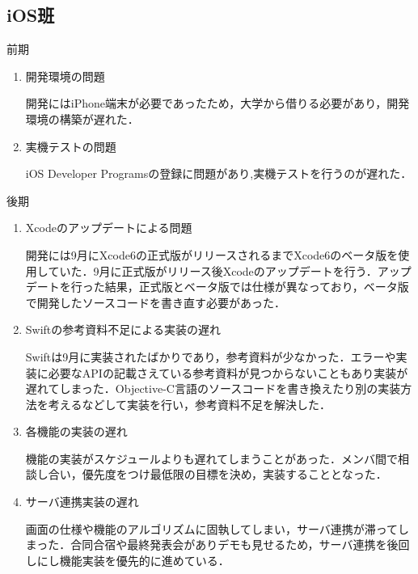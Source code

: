 \subsection{iOS班}
前期
\begin{enumerate}
\item 開発環境の問題
\par 開発にはiPhone端末が必要であったため，大学から借りる必要があり，開発環境の構築が遅れた．
\item 実機テストの問題
\par iOS Developer Programsの登録に問題があり,実機テストを行うのが遅れた．
\end{enumerate}

後期
\begin{enumerate}
\item Xcodeのアップデートによる問題
\par 開発には9月にXcode6の正式版がリリースされるまでXcode6のベータ版を使用していた．9月に正式版がリリース後Xcodeのアップデートを行う．アップデートを行った結果，正式版とベータ版では仕様が異なっており，ベータ版で開発したソースコードを書き直す必要があった．
\item Swiftの参考資料不足による実装の遅れ
\par Swiftは9月に実装されたばかりであり，参考資料が少なかった．エラーや実装に必要なAPIの記載さえている参考資料が見つからないこともあり実装が遅れてしまった．Objective-C言語のソースコードを書き換えたり別の実装方法を考えるなどして実装を行い，参考資料不足を解決した．
\item 各機能の実装の遅れ
\par 機能の実装がスケジュールよりも遅れてしまうことがあった．メンバ間で相談し合い，優先度をつけ最低限の目標を決め，実装することとなった．
\item サーバ連携実装の遅れ
\par
画面の仕様や機能のアルゴリズムに固執してしまい，サーバ連携が滞ってしまった．合同合宿や最終発表会がありデモも見せるため，サーバ連携を後回しにし機能実装を優先的に進めている．
\end{enumerate}

